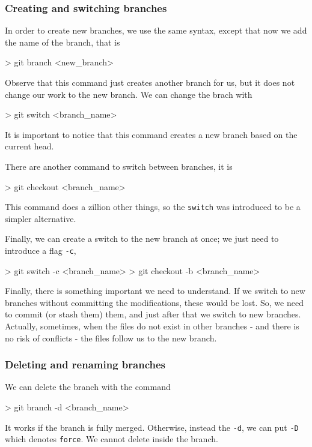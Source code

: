 \subsubsection{Creating and switching branches}

In order to create new branches, we use the same syntax, except that now 
we add the name of the branch, that is
\begin{listing}{1}
> git branch <new_branch>
\end{listing}
Observe that this command just creates another branch for us, 
but it does not change our work to the new branch. We can change the brach with
\begin{listing}{1}
> git switch <branch_name>
\end{listing}
It is important to notice that this command creates a new branch based on the current head.

There are another command to switch between branches, it is 
\begin{listing}{1}
> git checkout <branch_name>
\end{listing}   
This command does a zillion other things, so the \verb|switch| 
was introduced to be a simpler alternative. 

Finally, we can create a switch to the new branch at once; 
we just need to introduce a flag \verb|-c|, 
\begin{listing}{1}
> git switch -c <branch_name>
> git checkout -b <branch_name>
\end{listing} 

Finally, there is something important we need to understand. If we switch to new 
branches without committing the modifications, these would be lost. So, we need 
to commit (or stash them) them, and just after that we switch to new branches. 
Actually, sometimes, when the files do not exist in other branches - and there 
is no risk of conflicts - the files follow us to the new branch.

\subsubsection{Deleting and renaming branches}

We can delete the branch with the command 
\begin{listing}{1}
> git branch -d <branch_name>
\end{listing}   
It works if the branch is fully merged. Otherwise,  
instead the \verb|-d|, we can put \verb|-D| which denotes \verb|force|. We cannot delete inside the branch.

